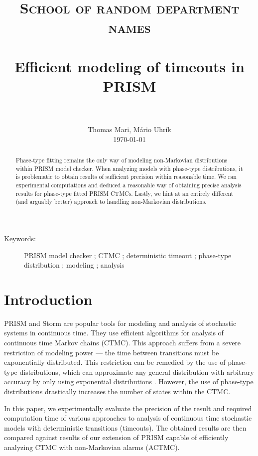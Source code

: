 \documentclass[paper=a4, fontsize=11pt]{scrartcl}
\title{
	\usefont{OT1}{bch}{b}{n}
	\normalfont \normalsize \textsc{School of random department names} \\ [25pt]
	\horrule{0.5pt} \\[0.4cm]
	\huge Efficient modeling of timeouts in PRISM \\
	\horrule{2pt} \\[0.5cm]
}
\author{
	\normalfont 								\normalsize
	Thomas Mari, M\'{a}rio Uhr\'{i}k\\[-3pt]		\normalsize
	\today
}
\date{}
\numberwithin{equation}{section}		%
\numberwithin{figure}{section}			%
\numberwithin{table}{section}				%
\begin{document}
	\maketitle
	
	\begin{abstract}
		Phase-type fitting remains the only way of modeling non-Markovian distributions within PRISM model checker.
		When analyzing models with phase-type distributions, it is problematic to obtain results of sufficient precision within reasonable time.
		We ran experimental computations and deduced a reasonable way of obtaining precise analysis results for phase-type fitted PRISM CTMCs.
		Lastly, we hint at an entirely different (and arguably better) approach to handling non-Markovian distributions.
	\end{abstract}
	
	\begin{description}
		
		\item[Keywords:] 	PRISM model checker ; CTMC ; deterministic timeout ; phase-type distribution ; modeling ; analysis
		
	\end{description}
	
	
	
	\section{Introduction}
	\label{S:1}
	
	PRISM \cite{KNP11} and Storm \cite{DBLP:journals/corr/DehnertJK017} are popular tools for modeling and analysis of stochastic systems in continuous time. They use efficient algorithms for analysis of continuous time Markov chains (CTMC). This approach suffers from a severe restriction of modeling power --- the time between transitions must be exponentially distributed. This restriction can be remedied by the use of phase-type distributions, which can approximate any general distribution with arbitrary accuracy by only using exponential distributions \cite{Buchholz:2014:IMP:2683922}. However, the use of phase-type distributions drastically increases the number of states within the CTMC.
	
	In this paper, we experimentally evaluate the precision of the result and required computation time of various approaches to analysis of continuous time stochastic models with deterministic transitions (timeouts). The obtained results are then compared against results of our extension of PRISM capable of efficiently analyzing CTMC with non-Markovian alarms (ACTMC).
	
\end{document}
